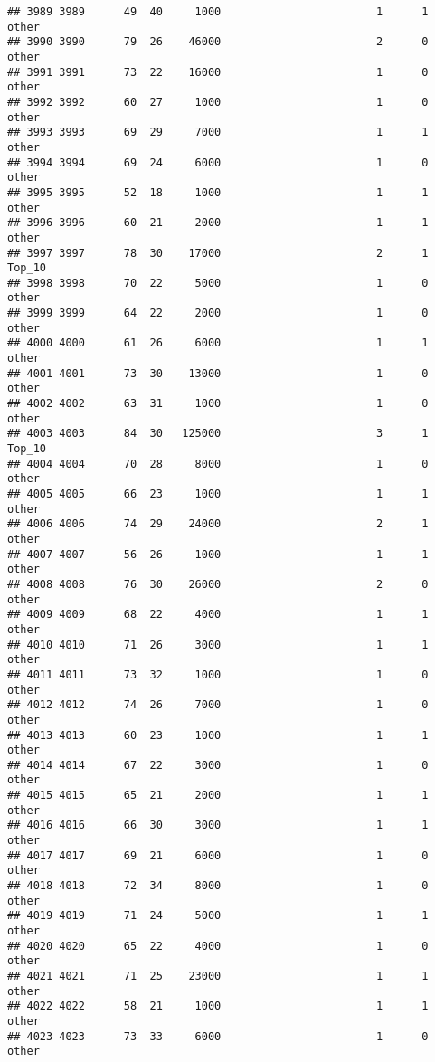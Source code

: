 \documentclass[
]{article}
\begin{document}
\begin{verbatim}
## 3989 3989      49  40     1000                        1      1    other
## 3990 3990      79  26    46000                        2      0    other
## 3991 3991      73  22    16000                        1      0    other
## 3992 3992      60  27     1000                        1      0    other
## 3993 3993      69  29     7000                        1      1    other
## 3994 3994      69  24     6000                        1      0    other
## 3995 3995      52  18     1000                        1      1    other
## 3996 3996      60  21     2000                        1      1    other
## 3997 3997      78  30    17000                        2      1   Top_10
## 3998 3998      70  22     5000                        1      0    other
## 3999 3999      64  22     2000                        1      0    other
## 4000 4000      61  26     6000                        1      1    other
## 4001 4001      73  30    13000                        1      0    other
## 4002 4002      63  31     1000                        1      0    other
## 4003 4003      84  30   125000                        3      1   Top_10
## 4004 4004      70  28     8000                        1      0    other
## 4005 4005      66  23     1000                        1      1    other
## 4006 4006      74  29    24000                        2      1    other
## 4007 4007      56  26     1000                        1      1    other
## 4008 4008      76  30    26000                        2      0    other
## 4009 4009      68  22     4000                        1      1    other
## 4010 4010      71  26     3000                        1      1    other
## 4011 4011      73  32     1000                        1      0    other
## 4012 4012      74  26     7000                        1      0    other
## 4013 4013      60  23     1000                        1      1    other
## 4014 4014      67  22     3000                        1      0    other
## 4015 4015      65  21     2000                        1      1    other
## 4016 4016      66  30     3000                        1      1    other
## 4017 4017      69  21     6000                        1      0    other
## 4018 4018      72  34     8000                        1      0    other
## 4019 4019      71  24     5000                        1      1    other
## 4020 4020      65  22     4000                        1      0    other
## 4021 4021      71  25    23000                        1      1    other
## 4022 4022      58  21     1000                        1      1    other
## 4023 4023      73  33     6000                        1      0    other

\end{verbatim}
\end{document}

